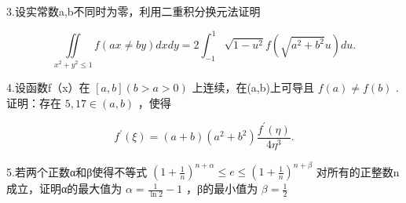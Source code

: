 \documentclass[11pt,fontset=fandol]{ctexart}
\begin{document}
3.设实常数a,b不同时为零，利用二重积分换元法证明

\[
\underset { x ^ { 2 } + y ^ { 2 } \leq 1 } { \iint } f ( a x \neq b y ) d x d y = 2 \int _ { - 1 } ^ { 1 } \sqrt { 1 - u ^ { 2 } } f ( \sqrt { a ^ { 2 } + b ^ { 2 } } u ) d u .
\]

4.设函数f（x）在 \(\left[ a , b \right] \left( b > a > 0 \right)\)
上连续，在(a,b)上可导且 \(f ( a ) \neq f ( b )\) .证明：存在
\(5 , 1 7 \in ( a , b )\) ，使得

\[
f ^ { \prime } ( \xi ) = ( a + b ) ( a ^ { 2 } + b ^ { 2 } ) \frac { f ^ { \prime } ( \eta ) } { 4 \eta ^ { 3 } } .
\]

5.若两个正数α和β使得不等式
\(( 1 + \frac { 1 } { n } ) ^ { n + \alpha } \leq e \leq ( 1 + \frac { 1 } { n } ) ^ { n + \beta }\)
对所有的正整数n成立，证明α的最大值为
\(\alpha = \frac { 1 } { \ln 2 } - 1\) ，β的最小值为
\(\beta = \frac { 1 } { 2 }\)
\end{document}
